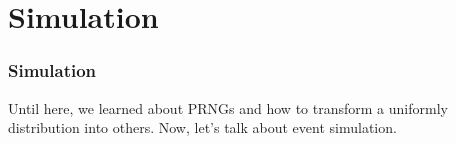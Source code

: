 

\section{Simulation}

\begin{frame}
    \frametitle{Simulation}

    Until here, we learned about PRNGs and how to transform a uniformly distribution
    into others. Now, let's talk about event simulation.

\end{frame}
